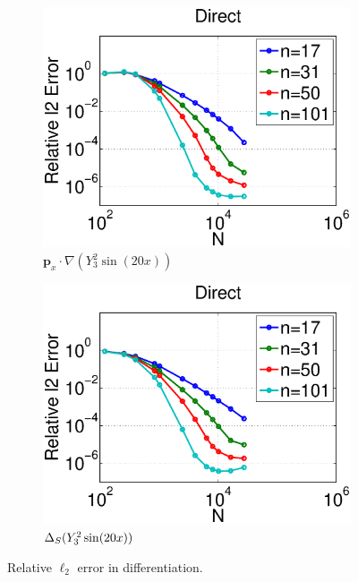 \begin{figure}
	\centering
	\begin{subfigure}[t]{0.48\textwidth}
	\includegraphics[width=1.0\textwidth]{../figures/appendices/direct_vs_indirect_weights/compare_weight_generation/xsfc_vs_xsfc_alt_on_sph32_times_sine_20x/direct_rel_l2_error.eps}
	\caption{$\mathbf{p}_{x} \cdot \nabla ( Y_{3}^{2} \sin(20 x))$ }
	\end{subfigure}
	\begin{subfigure}[t]{0.48\textwidth}
	\includegraphics[width=1.0\textwidth]{../figures/appendices/direct_vs_indirect_weights/compare_weight_generation/lsfc_vs_px_grad_dot_px_grad/direct_rel_l2_error.eps}
	\caption{$\Delta_S ( Y_{3}^{2} \sin(20 x) )$}
    \end{subfigure}
	\caption{Relative $\ell_{2}$ error in differentiation.}
\end{figure}



